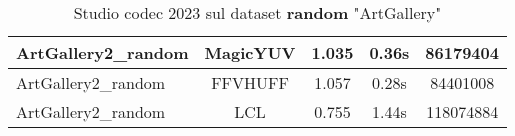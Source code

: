 \begin{table}[ht]
\begin{tabular}{|l|c|c|c|c|}
ArtGallery2\_random          & MagicYUV  & 1.035                                                            & 0.36s                                                         & 86179404                                                     \\ \hline
ArtGallery2\_random          & FFVHUFF   & 1.057                                                            & 0.28s                                                         & 84401008                                                     \\ \hline
ArtGallery2\_random          & LCL       & 0.755                                                            & 1.44s                                                         & 118074884                                                    \\ \hline
\end{tabular}
\caption{Studio codec 2023 sul dataset \textbf{random} "ArtGallery"}
\end{table}

